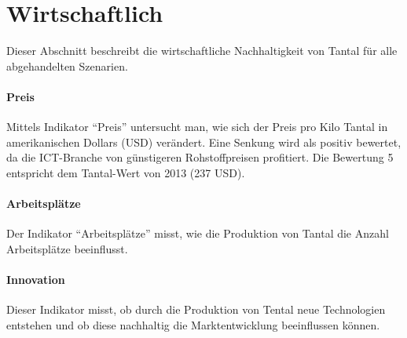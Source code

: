 
\section{Wirtschaftlich}\label{sec:conflict}

Dieser Abschnitt beschreibt die wirtschaftliche Nachhaltigkeit von Tantal für alle abgehandelten Szenarien.
\paragraph{Preis}
Mittels Indikator ``Preis'' untersucht man, wie sich der Preis pro Kilo Tantal
in amerikanischen Dollars (USD) verändert. Eine Senkung wird als positiv bewertet, da die ICT-Branche von günstigeren Rohstoffpreisen profitiert. Die Bewertung 5 entspricht dem Tantal-Wert von 2013 (237 USD).

\paragraph{Arbeitsplätze}
Der Indikator ``Arbeitsplätze'' misst, wie die Produktion von Tantal die Anzahl
Arbeitsplätze beeinflusst.

\paragraph{Innovation}
Dieser Indikator misst, ob durch die Produktion von Tental neue Technologien
entstehen und ob diese nachhaltig die Marktentwicklung beeinflussen können.

